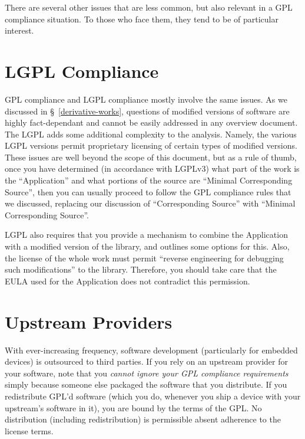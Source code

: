 There are several other issues that are less common, but also relevant in
a GPL compliance situation.  To those who face them, they tend to be of
particular interest.

\section{LGPL Compliance}
\label{lgpl}

GPL compliance and LGPL compliance mostly involve the same issues.  As we
discussed in \S~\ref{derivative-works}, questions of modified versions of
software are highly fact-dependant and cannot be easily addressed in any
overview document.  The LGPL adds some additional complexity to the
analysis.  Namely, the various LGPL versions permit proprietary licensing
of certain types of modified versions.  These issues are well beyond the
scope of this document, but as a rule of thumb, once you have determined
(in accordance with LGPLv3) what part of the work is the ``Application''
and what portions of the source are ``Minimal Corresponding Source'', then
you can usually proceed to follow the GPL compliance rules that we
discussed, replacing our discussion of ``Corresponding Source'' with
``Minimal Corresponding Source''.

LGPL also requires that you provide a mechanism to combine the Application
with a modified version of the library, and outlines some options for
this.  Also, the license of the whole work must permit ``reverse
engineering for debugging such modifications'' to the library.  Therefore,
you should take care that the EULA used for the Application does not
contradict this permission.

\section{Upstream Providers}
\label{upstream}

With ever-increasing frequency, software development (particularly for
embedded devices) is outsourced to third parties.  If you rely on an
upstream provider for your software, note that you \emph{cannot ignore
  your GPL compliance requirements} simply because someone else packaged
the software that you distribute.  If you redistribute GPL'd software
(which you do, whenever you ship a device with your upstream's software in
it), you are bound by the terms of the GPL\@.  No distribution (including
redistribution) is permissible absent adherence to the license terms.

